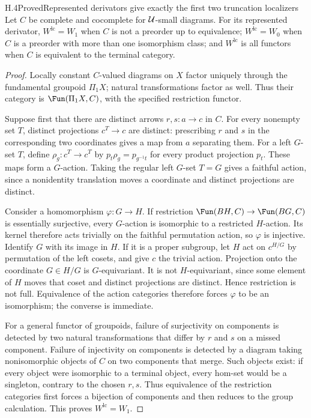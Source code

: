 \begin{claim}{H.4}{Proved}{Represented derivators give exactly the first two truncation localizers}
Let $C$ be complete and cocomplete for $\mathcal U$-small diagrams. For its represented derivator, $W^{\mathrm{lc}}=W_1$ when $C$ is not a preorder up to equivalence; $W^{\mathrm{lc}}=W_0$ when $C$ is a preorder with more than one isomorphism class; and $W^{\mathrm{lc}}$ is all functors when $C$ is equivalent to the terminal category.
\end{claim}
\begin{proof}
Locally constant $C$-valued diagrams on $X$ factor uniquely through the fundamental groupoid $\Pi_1X$; natural transformations factor as well. Thus their category is $\Fun(\Pi_1X,C)$, with the specified restriction functor.

Suppose first that there are distinct arrows $r,s:a\to c$ in $C$. For every nonempty set $T$, distinct projections $c^T\to c$ are distinct: prescribing $r$ and $s$ in the corresponding two coordinates gives a map from $a$ separating them. For a left $G$-set $T$, define $\rho_g:c^T\to c^T$ by $p_t\rho_g=p_{g^{-1}t}$ for every product projection $p_t$. These maps form a $G$-action. Taking the regular left $G$-set $T=G$ gives a faithful action, since a nonidentity translation moves a coordinate and distinct projections are distinct.

Consider a homomorphism $\varphi:G\to H$. If restriction $\Fun(BH,C)\to\Fun(BG,C)$ is essentially surjective, every $G$-action is isomorphic to a restricted $H$-action. Its kernel therefore acts trivially on the faithful permutation action, so $\varphi$ is injective. Identify $G$ with its image in $H$. If it is a proper subgroup, let $H$ act on $c^{H/G}$ by permutation of the left cosets, and give $c$ the trivial action. Projection onto the coordinate $G\in H/G$ is $G$-equivariant. It is not $H$-equivariant, since some element of $H$ moves that coset and distinct projections are distinct. Hence restriction is not full. Equivalence of the action categories therefore forces $\varphi$ to be an isomorphism; the converse is immediate.

For a general functor of groupoids, failure of surjectivity on components is detected by two natural transformations that differ by $r$ and $s$ on a missed component. Failure of injectivity on components is detected by a diagram taking nonisomorphic objects of $C$ on two components that merge. Such objects exist: if every object were isomorphic to a terminal object, every hom-set would be a singleton, contrary to the chosen $r,s$. Thus equivalence of the restriction categories first forces a bijection of components and then reduces to the group calculation. This proves $W^{\mathrm{lc}}=W_1$.


\end{proof}
